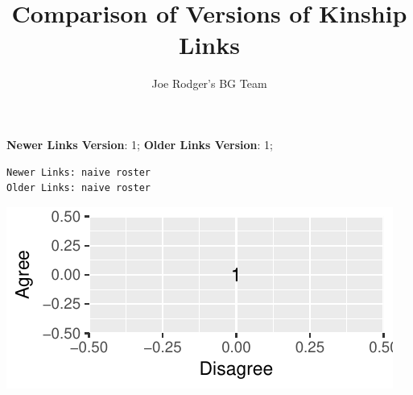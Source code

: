\documentclass[a4paper]{article}\usepackage[]{graphicx}\usepackage[]{color}
\title{Comparison of Versions of Kinship Links}
\author{Joe Rodger's BG Team}
\makeatletter
\def\maxwidth{ %
  \ifdim\Gin@nat@width>\linewidth
    \linewidth
  \else
    \Gin@nat@width
  \fi
}
\newenvironment{kframe}{%
 \def\at@end@of@kframe{}%
 \ifinner\ifhmode%
  \def\at@end@of@kframe{\end{minipage}}%
  \begin{minipage}{\columnwidth}%
 \fi\fi%
 \def\FrameCommand##1{\hskip\@totalleftmargin \hskip-\fboxsep
 \colorbox{shadecolor}{##1}\hskip-\fboxsep
     \hskip-\linewidth \hskip-\@totalleftmargin \hskip\columnwidth}%
 \MakeFramed {\advance\hsize-\width
   \@totalleftmargin\z@ \linewidth\hsize
   \@setminipage}}%
 {\par\unskip\endMakeFramed%
 \at@end@of@kframe}
\newenvironment{knitrout}{}{} %
\makeatother
\begin{document}
\maketitle

\setlength{\parindent}{0pt}%




















\textbf{Newer Links Version}: 1;
\textbf{Older Links Version}: 1;

\begin{knitrout}
\color{fgcolor}\begin{kframe}
\begin{verbatim}
Newer Links: naive roster
Older Links: naive roster
\end{verbatim}
\end{kframe}
\end{knitrout}

\begin{knitrout}
\color{fgcolor}
\includegraphics[width=\maxwidth]{figure/graph-roc-1} 

\end{knitrout}
\end{document}
